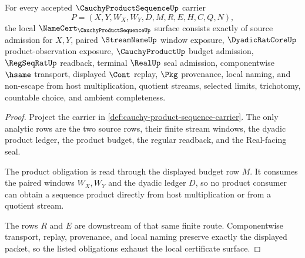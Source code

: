 \begin{theorem}
\label{thm:cauchy-product-sequence-namecert-obligations}
For every accepted $\CauchyProductSequenceUp$ carrier
$$
P=(X,Y,W_X,W_Y,D,M,R,E,H,C,Q,N),
$$
the local $\NameCert_{\CauchyProductSequenceUp}$ surface consists exactly of source admission for $X,Y$, paired $\StreamNameUp$ window exposure, $\DyadicRatCoreUp$ product-observation exposure, $\CauchyProductUp$ budget admission, $\RegSeqRatUp$ readback, terminal $\RealUp$ seal admission, componentwise $\hsame$ transport, displayed $\Cont$ replay, $\Pkg$ provenance, local naming, and non-escape from host multiplication, quotient streams, selected limits, trichotomy, countable choice, and ambient completeness.
\end{theorem}
\begin{proof}
Project the carrier in \autoref{def:cauchy-product-sequence-carrier}. The only analytic rows are the two source rows, their finite stream windows, the dyadic product ledger, the product budget, the regular readback, and the Real-facing seal.

The product obligation is read through the displayed budget row $M$. It consumes the paired windows $W_X,W_Y$ and the dyadic ledger $D$, so no product consumer can obtain a sequence product directly from host multiplication or from a quotient stream.

The rows $R$ and $E$ are downstream of that same finite route. Componentwise transport, replay, provenance, and local naming preserve exactly the displayed packet, so the listed obligations exhaust the local certificate surface.
\end{proof}

